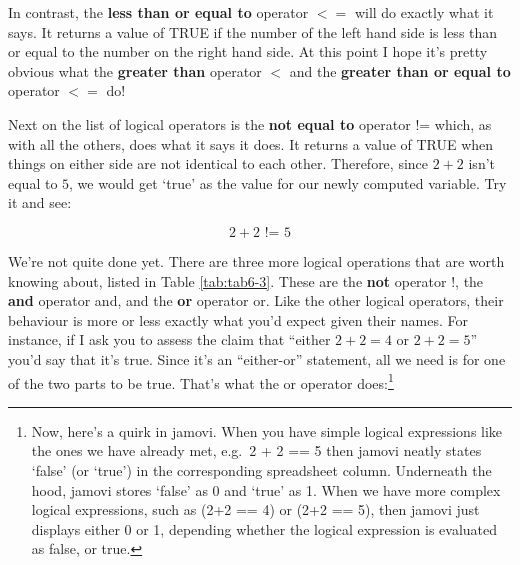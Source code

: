\documentclass[
]{book}
\begin{document}
In contrast, the \textbf{less than or equal to} operator \(<=\) will do exactly what it says. It returns a value of TRUE if the number of the left hand side is less than or equal to the number on the right hand side. At this point I hope it's pretty obvious what the \textbf{greater than} operator \(<\) and the \textbf{greater than or equal to} operator \(<=\) do!

Next on the list of logical operators is the \textbf{not equal to} operator != which, as with all the others, does what it says it does. It returns a value of TRUE when things on either side are not identical to each other. Therefore, since \(2 + 2\) isn't equal to \(5\), we would get `true' as the value for our newly computed variable. Try it and see:

\[2 + 2 \text{ != } 5\]

We're not quite done yet. There are three more logical operations that are worth knowing about, listed in Table \ref{tab:tab6-3}. These are the \textbf{not} operator !, the \textbf{and} operator and, and the \textbf{or} operator or. Like the other logical operators, their behaviour is more or less exactly what you'd expect given their names. For instance, if I ask you to assess the claim that ``either \(2 + 2 = 4\) or \(2 + 2 = 5\)'' you'd say that it's true. Since it's an ``either-or'' statement, all we need is for one of the two parts to be true. That's what the or operator does:\footnote{Now, here's a quirk in jamovi. When you have simple logical expressions like the ones we have already met, e.g.~2 + 2 == 5 then jamovi neatly states `false' (or `true') in the corresponding spreadsheet column. Underneath the hood, jamovi stores `false' as 0 and `true' as 1. When we have more complex logical expressions, such as (2+2 == 4) or (2+2 == 5), then jamovi just displays either 0 or 1, depending whether the logical expression is evaluated as false, or true.}

 
  \providecommand{\huxb}[2]{\arrayrulecolor[RGB]{#1}\global\arrayrulewidth=#2pt}
  \providecommand{\huxvb}[2]{\color[RGB]{#1}\vrule width #2pt}
  \providecommand{\huxtpad}[1]{\rule{0pt}{#1}}
  \providecommand{\huxbpad}[1]{\rule[-#1]{0pt}{#1}}
\end{document}

